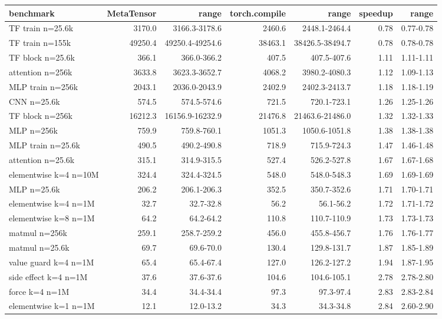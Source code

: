 \begin{tabular}{lrrrrrr}
\toprule
benchmark & MetaTensor & range & torch.compile & range & speedup & range \\
\midrule
TF train n=25.6k & 3170.0 & 3166.3-3178.6 & 2460.6 & 2448.1-2464.4 & 0.78 & 0.77-0.78 \\
TF train n=155k & 49250.4 & 49250.4-49254.6 & 38463.1 & 38426.5-38494.7 & 0.78 & 0.78-0.78 \\
TF block n=25.6k & 366.1 & 366.0-366.2 & 407.5 & 407.5-407.6 & 1.11 & 1.11-1.11 \\
attention n=256k & 3633.8 & 3623.3-3652.7 & 4068.2 & 3980.2-4080.3 & 1.12 & 1.09-1.13 \\
MLP train n=256k & 2043.1 & 2036.0-2043.9 & 2402.9 & 2402.3-2413.7 & 1.18 & 1.18-1.19 \\
CNN n=25.6k & 574.5 & 574.5-574.6 & 721.5 & 720.1-723.1 & 1.26 & 1.25-1.26 \\
TF block n=256k & 16212.3 & 16156.9-16232.9 & 21476.8 & 21463.6-21486.0 & 1.32 & 1.32-1.33 \\
MLP n=256k & 759.9 & 759.8-760.1 & 1051.3 & 1050.6-1051.8 & 1.38 & 1.38-1.38 \\
MLP train n=25.6k & 490.5 & 490.2-490.8 & 718.9 & 715.9-724.3 & 1.47 & 1.46-1.48 \\
attention n=25.6k & 315.1 & 314.9-315.5 & 527.4 & 526.2-527.8 & 1.67 & 1.67-1.68 \\
elementwise k=4 n=10M & 324.4 & 324.4-324.5 & 548.0 & 548.0-548.3 & 1.69 & 1.69-1.69 \\
MLP n=25.6k & 206.2 & 206.1-206.3 & 352.5 & 350.7-352.6 & 1.71 & 1.70-1.71 \\
elementwise k=4 n=1M & 32.7 & 32.7-32.8 & 56.2 & 56.1-56.2 & 1.72 & 1.71-1.72 \\
elementwise k=8 n=1M & 64.2 & 64.2-64.2 & 110.8 & 110.7-110.9 & 1.73 & 1.73-1.73 \\
matmul n=256k & 259.1 & 258.7-259.2 & 456.0 & 455.8-456.7 & 1.76 & 1.76-1.77 \\
matmul n=25.6k & 69.7 & 69.6-70.0 & 130.4 & 129.8-131.7 & 1.87 & 1.85-1.89 \\
value guard k=4 n=1M & 65.4 & 65.4-67.4 & 127.0 & 126.2-127.2 & 1.94 & 1.87-1.95 \\
side effect k=4 n=1M & 37.6 & 37.6-37.6 & 104.6 & 104.6-105.1 & 2.78 & 2.78-2.80 \\
force k=4 n=1M & 34.4 & 34.4-34.4 & 97.3 & 97.3-97.4 & 2.83 & 2.83-2.84 \\
elementwise k=1 n=1M & 12.1 & 12.0-13.2 & 34.3 & 34.3-34.8 & 2.84 & 2.60-2.90 \\

\end{tabular}
